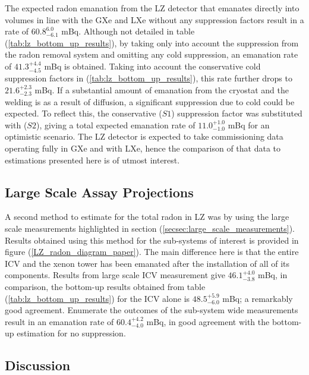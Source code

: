 The expected radon emanation from the LZ detector that emanates directly into volumes in line with the GXe and LXe without any suppression factors result in a rate of $60.8^{6.0}_{-6.1}$ mBq. Although not detailed in table (\ref{tab:lz_bottom_up_results}), by taking only into account the suppression from the radon removal system and omitting any cold suppression, an emanation rate of $41.3^{+4.4}_{-4.5}$ mBq is obtained. Taking into account the conservative cold suppression factors in (\ref{tab:lz_bottom_up_results}), this rate further drops to $21.6^{+2.3}_{-2.3}$ mBq. If a substantial amount of emanation from the cryostat and the welding is as a result of diffusion, a significant suppression due to cold could be expected. To reflect this, the conservative ($S1$) suppression factor was substituted with ($S2$), giving a total expected emanation rate of $11.0^{+1.0}_{-1.0}$ mBq for an optimistic scenario. The LZ detector is expected to take commissioning data operating fully in GXe and with LXe, hence the comparison of that data to estimations presented here is of utmost interest.

\subsection{Large Scale Assay Projections}

A second method to estimate for the total radon in LZ was by using the large scale measurements highlighted in section (\ref{secsec:large_scale_measurements}). Results obtained using this method for the sub-systems of interest is provided in figure (\ref{LZ_radon_diagram_paper}). The main difference here is that the entire ICV and the xenon tower has been emanated after the installation of all of its components. Results from large scale ICV measurement give $46.1^{+4.0}_{-3.8}$ mBq, in comparison, the bottom-up results obtained from table (\ref{tab:lz_bottom_up_results}) for the ICV alone is $48.5^{+5.9}_{-6.0}$ mBq; a remarkably good agreement. Enumerate the outcomes of the sub-system wide measurements result in an emanation rate of $60.4^{+4.2}_{-4.0}$ mBq, in good agreement with the bottom-up estimation for no suppression.


\subsection{Discussion}

